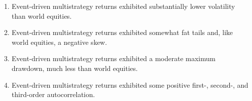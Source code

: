 \documentclass[11pt]{article}
\begin{document}
\begin{enumerate}
  \item Event-driven multistrategy returns exhibited substantially lower volatility than world equities.

  \item Event-driven multistrategy returns exhibited somewhat fat tails and, like world equities, a negative skew.

  \item Event-driven multistrategy returns exhibited a moderate maximum drawdown, much less than world equities.

  \item Event-driven multistrategy returns exhibited some positive first-, second-, and third-order autocorrelation.

\end{enumerate}
\end{document}
